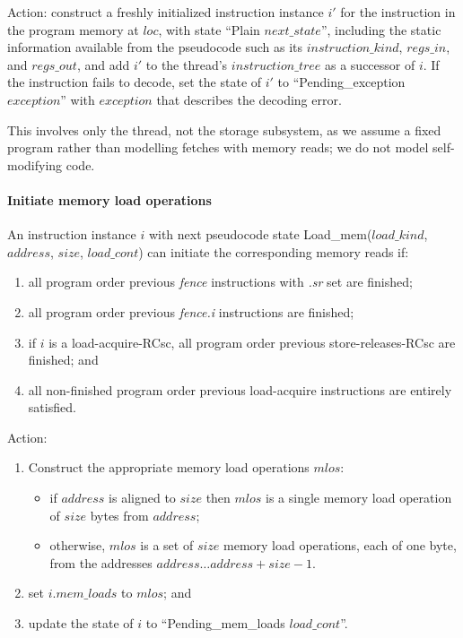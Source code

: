 Action: construct a freshly initialized instruction instance $i'$ for the instruction in the program memory at $loc$, with state ``{\sc Plain} $next\_state$'', including the static information available from the pseudocode such as its $instruction\_kind$, $regs\_in$, and $regs\_out$, and add $i'$ to the thread's $instruction\_tree$ as a successor of $i$. If the instruction fails to decode, set the state of $i'$ to ``{\sc Pending\_exception} $exception$'' with $exception$ that describes the decoding error.

\begin{commentary}
This involves only the thread, not the storage subsystem, as we assume a fixed program rather than modelling fetches with memory reads; we do not model self-modifying code.
\end{commentary}


\paragraph{Initiate memory load operations}\label{omm:thread:initiate_mem_read}
An instruction instance $i$ with next pseudocode state {\sc Load\_mem}($load\_kind$, $address$, $size$, $load\_cont$) can initiate the corresponding memory reads if:
\begin{enumerate}
\item all program order previous {\em fence} instructions with {\em .sr} set are finished;
\item all program order previous {\em fence.i} instructions are finished; 
\item if $i$ is a load-acquire-RCsc, all program order previous store-releases-RCsc are finished; and
\item all non-finished program order previous load-acquire instructions are entirely satisfied.
\end{enumerate}
Action:
\begin{enumerate}
\item Construct the appropriate memory load operations $mlos$:
  \begin{itemize}
  \item if $address$ is aligned to $size$ then $mlos$ is a single memory load operation of $size$ bytes from $address$;
  \item otherwise, $mlos$ is a set of $size$ memory load operations, each of one byte, from the addresses $address\ldots address+size-1$.
  \end{itemize}
\item set $i.mem\_loads$ to $mlos$; and
\item update the state of $i$ to ``{\sc Pending\_mem\_loads} $load\_cont$''.
\end{enumerate}


